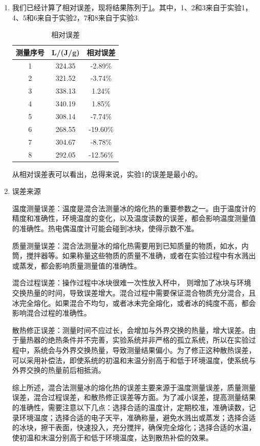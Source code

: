 \documentclass[dvipsnames, svgnames,a4paper,11pt]{article}
\begin{document}
	\begin{enumerate}
		\item 我们已经计算了相对误差，现将结果陈列于\cref{tab:tab9}。其中，1、2和3来自于实验1，4、5和6来自于实验2，7和8来自于实验3.
		
		\begin{table}[h]
			\centering
			\begin{tabular}{|c|c|c|}
				\hline
				测量序号 & L/(J/g) & 相对误差 \\
				\hline
				1 & 324.35 & -2.89\% \\
				2 & 321.52 & -3.74\% \\
				3 & 338.13 & 1.24\% \\
				4 & 340.19 & 1.85\% \\
				5 & 308.14 & -7.74\% \\
				6 & 268.55 & -19.60\% \\
				7 & 304.67 & -8.78\% \\
				8 & 292.05 & -12.56\% \\
				\hline
			\end{tabular}
			\caption{相对误差}
			\label{tab:tab9}
		\end{table}
		
		从相对误差表可以看出，总得来说，实验1的误差是最小的。
		
		\item 误差来源
		
		温度测量误差：温度是混合法测量冰的熔化热的重要参数之一。由于温度计的精度和准确性，环境温度的变化，以及温度读数的误差，都会影响温度测量值的准确性。热电偶温度计可能会碰到冰块，使得示数不准。
		
		质量测量误差：混合法测量冰的熔化热需要用到已知质量的物质，如水，内筒，搅拌器等。如果称量这些物质的质量不准确，或者在实验过程中有水溅出或蒸发，都会影响质量测量值的准确性。
		
		混合过程误差：操作过程中冰块很难一次性放入杯中， 则增加了冰块与环境交换热量的时间，导致误差增大。混合过程中需要保证混合物质充分混合，且冰完全熔化。如果混合不均匀，或者冰未完全熔化，或者冰的纯度不高，都会影响混合过程的准确性。
		
		散热修正误差：测量时间不应过长，会增加与外界交换的热量，增大误差。由于量热器的绝热条件并不完善，实验系统并非严格的孤立系统，所以在实验过程中，系统会与外界交换热量，导致测量结果偏小。为了修正这种散热误差，可以采用补偿法，即使系统的初温和末温分别高于和低于环境温度，使系统与外界交换的热量前后相抵消。
		
		综上所述，混合法测量冰的熔化热的误差主要来源于温度测量误差，质量测量误差，混合过程误差，和散热修正误差等方面。为了减小误差，提高测量结果的准确性，需要注意以下几点：选择合适的温度计，定期校准，准确读数，记录环境温度；选择合适的电子天平，准确称量，避免水溅出或蒸发；选择合适的冰块，擦干表面，快速投入，充分搅拌，确保完全熔化；选择合适的水温，使初温和末温分别高于和低于环境温度，达到散热补偿的效果。
		

\end{enumerate}
\end{document}
